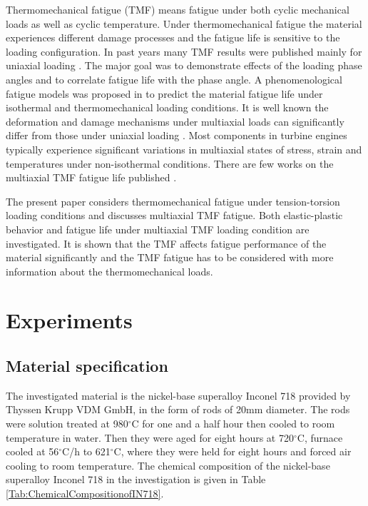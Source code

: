 \documentclass[preprint,5p,twocolumn,11pt,sort&compress]{elsarticle}
\begin{document}
Thermomechanical fatigue (TMF) means fatigue under both cyclic mechanical loads as well as cyclic temperature. Under thermomechanical fatigue the material experiences different damage processes and the fatigue life is sensitive to the loading configuration. In past years many TMF results were published mainly for uniaxial loading \cite{Evans2008, Kulawinski2015, Remy2003, Bauer2009}. The major goal was to demonstrate effects of the loading phase angles and to correlate fatigue life with the phase angle. A phenomenological fatigue models was proposed  in \cite{Vose2013} to predict the material fatigue life under isothermal and thermomechanical loading conditions. It is well known the deformation and damage mechanisms under multiaxial loads can significantly differ from those under uniaxial loading \cite{Fang2015, Kang2004, Chen2004}. Most components in turbine engines typically experience significant variations in multiaxial states of stress, strain and temperatures under non-isothermal conditions. There are few works on the multiaxial TMF fatigue life published \cite{Brookes2010}.

The present paper considers thermomechanical fatigue under tension-torsion loading conditions and discusses multiaxial TMF fatigue. Both elastic-plastic behavior and fatigue life under multiaxial TMF loading condition are investigated. It is shown that the TMF affects fatigue performance of the material significantly and the TMF fatigue has to be considered with more information about the thermomechanical loads.

\section{Experiments}
\subsection{Material specification}
The investigated material is the nickel-base superalloy Inconel 718 provided by Thyssen Krupp VDM GmbH, in the form of rods of 20mm diameter.
The rods were solution treated at 980$^{\circ}$C for one and a half hour then cooled to room temperature in water.
Then they were aged for eight hours at 720$^{\circ}$C, furnace cooled at 56$^{\circ}$C/h to 621$^{\circ}$C, where they were held for eight hours and forced air cooling to room temperature.
The chemical composition of the nickel-base superalloy Inconel 718 in the investigation is given in Table \ref{Tab:ChemicalCompositionofIN718}.
\end{document}
